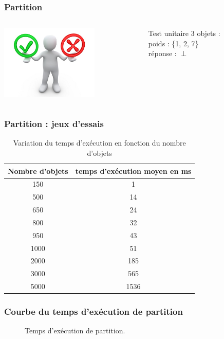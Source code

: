 \documentclass[french]{beamer}
\begin{document}
\begin{frame}
  \frametitle{Partition}
  \begin{columns}
    \begin{column}[]{4cm}
      \begin{center}
        \includegraphics[height=3.5cm]{unitest.jpg}
      \end{center}
    \end{column}
      \begin{column}[]{6cm}
        \begin{block}{Test unitaire}
	3 objets : \\
	poids : \{1, 2, 7\} \\
	réponse : $\perp$
        \end{block}
      \end{column}
    \end{columns}
\end{frame}
  \begin{frame}
  \frametitle{Partition : jeux d'essais}

\begin{table}[h!]
\centering
\begin{tabular}{|c|c|}
\hline
Nombre d'objets & temps d'exécution moyen en ms\\
\hline
150 & 1\\
\hline
500 & 14\\
\hline
650 & 24\\
\hline
800 & 32\\
\hline
950 & 43\\
\hline
1000 & 51\\
\hline
2000 & 185\\
\hline
3000 & 565\\
\hline
5000 & 1536\\
\hline
\end{tabular}
\caption {Variation du temps d'exécution en fonction du nombre d'objets}
\end{table}
\end{frame}

\begin{frame}
\frametitle{Courbe du temps d'exécution de partition}
\begin{figure}[h!]
\centering
{}
\caption{Temps d'exécution de partition.}
\end{figure}

  \end{frame}
  
\end{document}
